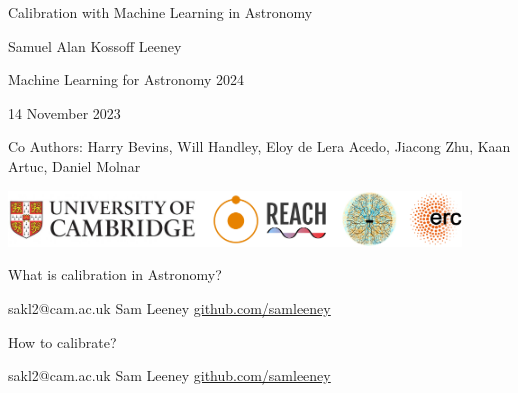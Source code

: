 \documentclass{beamer}
\begin{document}
\begin{frame}
  \begin{center}
    {\LARGE Calibration with Machine Learning in Astronomy\par}
    \vspace{0.5cm}

    {\large Samuel Alan Kossoff Leeney\par}
    \vspace{0.5cm}

    {\normalsize Machine Learning for Astronomy 2024\par}

    {\normalsize 14 November 2023\par}
    \vspace{1cm}

    {\footnotesize Co Authors: Harry Bevins, Will Handley, Eloy de Lera Acedo, Jiacong Zhu, Kaan Artuc, Daniel Molnar\par}
    \vfill

    \includegraphics[width=0.9\textwidth]{affiliations.png}
  \end{center}
\end{frame}

\begin{frame}{\small{What is calibration in Astronomy?}}
\begin{figure}[h]
  \centering
  
\end{figure}
\vfill
\tiny{sakl2@cam.ac.uk \hfill Sam Leeney \hfill \href{https://github.com/samleeney}{github.com/samleeney}}

\end{frame}


\begin{frame}{\small{How to calibrate?}}
\begin{figure}[h]
  \centering
  
\end{figure}
\vspace{0.7cm}
\tiny{sakl2@cam.ac.uk \hfill Sam Leeney \hfill \href{https://github.com/samleeney}{github.com/samleeney}}

\end{frame}
\end{document}
